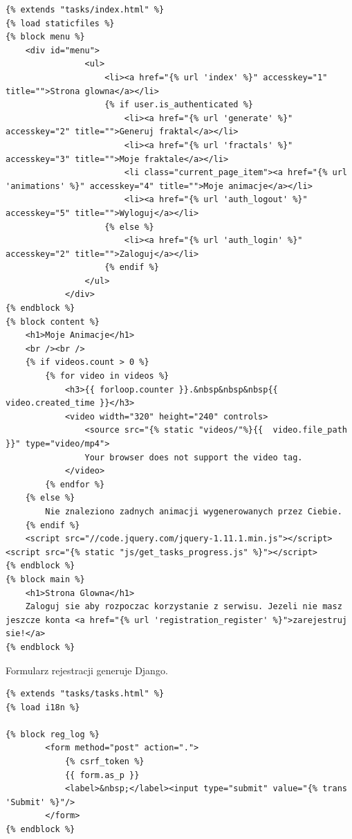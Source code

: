 \documentclass[a4paper]{article}
\begin{document}
\begin{lstlisting}
{% extends "tasks/index.html" %}
{% load staticfiles %}
{% block menu %}
    <div id="menu">
				<ul>
					<li><a href="{% url 'index' %}" accesskey="1" title="">Strona glowna</a></li>
                    {% if user.is_authenticated %}
					    <li><a href="{% url 'generate' %}" accesskey="2" title="">Generuj fraktal</a></li>
					    <li><a href="{% url 'fractals' %}" accesskey="3" title="">Moje fraktale</a></li>
					    <li class="current_page_item"><a href="{% url 'animations' %}" accesskey="4" title="">Moje animacje</a></li>
					    <li><a href="{% url 'auth_logout' %}" accesskey="5" title="">Wyloguj</a></li>
                    {% else %}
                        <li><a href="{% url 'auth_login' %}" accesskey="2" title="">Zaloguj</a></li>
                    {% endif %}
				</ul>
			</div>
{% endblock %}
{% block content %}
    <h1>Moje Animacje</h1>
    <br /><br />
    {% if videos.count > 0 %}
        {% for video in videos %}
            <h3>{{ forloop.counter }}.&nbsp&nbsp&nbsp{{ video.created_time }}</h3>
            <video width="320" height="240" controls>
                <source src="{% static "videos/"%}{{  video.file_path }}" type="video/mp4">
                Your browser does not support the video tag.
            </video>
        {% endfor %}
    {% else %}
        Nie znaleziono zadnych animacji wygenerowanych przez Ciebie.
    {% endif %}
    <script src="//code.jquery.com/jquery-1.11.1.min.js"></script>
<script src="{% static "js/get_tasks_progress.js" %}"></script>
{% endblock %}
{% block main %}
    <h1>Strona Glowna</h1>
    Zaloguj sie aby rozpoczac korzystanie z serwisu. Jezeli nie masz jeszcze konta <a href="{% url 'registration_register' %}">zarejestruj sie!</a>
{% endblock %}
\end{lstlisting}

Formularz rejestracji generuje Django.
\begin{lstlisting}
{% extends "tasks/tasks.html" %}
{% load i18n %}

{% block reg_log %}
        <form method="post" action=".">
            {% csrf_token %}
            {{ form.as_p }}
            <label>&nbsp;</label><input type="submit" value="{% trans 'Submit' %}"/>
        </form>
{% endblock %}
\end{lstlisting}
\end{document}
